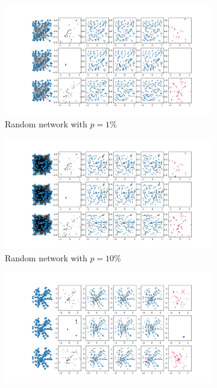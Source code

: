 \documentclass[a4paper,10pt]{article}
\begin{document}
\begin{figure}[htbp]
  \begin{subfigure}{0.24\textwidth}
    \centering
    \includegraphics[trim={0 13.2cm 29.35cm 0},clip,width=\textwidth]{../results/rn1-100N-noemb-fixed}
    \caption{Random network with $p=1\%$}
  \end{subfigure}
  \begin{subfigure}{0.24\textwidth}
    \centering
    \includegraphics[trim={0 13.2cm 29.35cm 0},clip,width=\textwidth]{../results/rn10-100N-noemb-fixed}
    \caption{Random network with $p=10\%$}
  \end{subfigure}
  \begin{subfigure}{0.24\textwidth}
    \centering
    \includegraphics[trim={0 13.2cm 29.35cm 0},clip,width=\textwidth]{../results/nn-100N-noemb-fixed}

\end{subfigure}
\end{figure}
\end{document}

